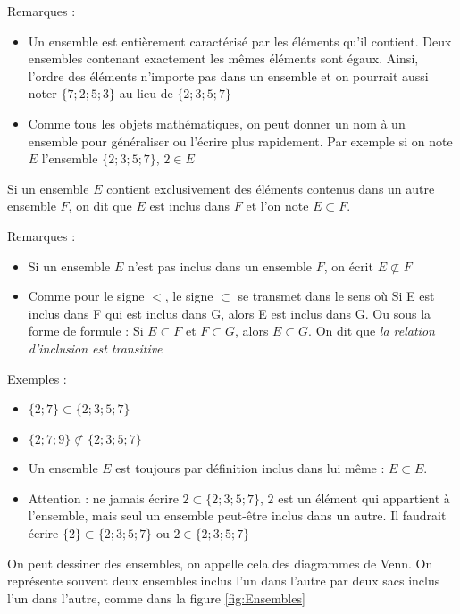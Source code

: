 \documentclass[10pt,a4paper]{book}
\begin{document}
Remarques : 
\begin{itemize}
\item Un ensemble est entièrement caractérisé par les éléments qu'il contient. Deux ensembles contenant exactement les mêmes éléments sont égaux. Ainsi, l'ordre des éléments n'importe pas dans un ensemble et on pourrait aussi noter $\{7;2;5;3\}$ au lieu de $\{2;3;5;7\}$
\item Comme tous les objets mathématiques, on peut donner un nom à un ensemble pour généraliser ou l'écrire plus rapidement. Par exemple si on note $E$ l'ensemble $\{2;3;5;7\}$, $2 \in E$
\end{itemize}


\begin{de}
     Si un ensemble $E$ contient exclusivement des éléments contenus dans un autre ensemble $F$, on dit que $E$ est \underline{inclus} dans $F$ et l'on note $E \subset F$.
\end{de}

Remarques :
\begin{itemize}
    \item Si un ensemble $E$ n'est pas inclus dans un ensemble $F$, on écrit $E \not\subset F$
    \item Comme pour le signe $<$, le signe $\subset$ se transmet dans le sens où Si E est inclus dans F qui est inclus dans G, alors E est inclus dans G. Ou sous la forme de formule : Si $E \subset F$ et $F \subset G$, alors $E \subset G$. On dit que \textit{la relation d'inclusion est transitive}
\end{itemize}
    

Exemples : 
\begin{itemize}
    \item $\{2;7\} \subset \{2;3;5;7\}$
    \item $\{2;7;9\} \not\subset \{2;3;5;7\}$
    \item Un ensemble $E$ est toujours par définition inclus dans lui même : $E \subset E$.
    \item Attention : ne jamais écrire $2 \subset \{2;3;5;7\}$, $2$ est un élément qui appartient à l'ensemble, mais seul un ensemble peut-être inclus dans un autre. Il faudrait écrire $\{2\} \subset \{2;3;5;7\}$ ou $2 \in \{2;3;5;7\}$
\end{itemize}

On peut dessiner des ensembles, on appelle cela des diagrammes de Venn. On représente souvent deux ensembles inclus l'un dans l'autre par deux sacs inclus l'un dans l'autre, comme dans la figure \ref{fig:Ensembles}
\end{document}
